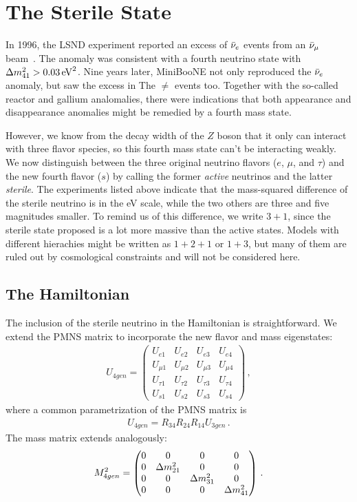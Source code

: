 % 
\section{The Sterile State}\label{sec:anomalies}
In 1996, the LSND experiment reported an excess of $\bar{\nu}_e$ events from an $\bar{\nu}_\mu$ beam~\cite{lsnd}. The anomaly was consistent with a fourth
neutrino state with $\dm[41] > \SI{0.03}{\eV \squared}$. Nine years later, MiniBooNE not only reproduced the $\bar{\nu}_e$ anomaly, but saw the excess in The
$\ne$ events too. Together with the so-called reactor and gallium analomalies, there were indications that both appearance and disappearance
anomalies might be remedied by a fourth mass state.

However, we know from the decay width of the $Z$ boson that it only can interact with three flavor species, so this fourth mass state can't be interacting weakly.
We now distinguish between the three original neutrino flavors ($e$, $\mu$, and $\tau$) and the new fourth flavor ($s$) by calling the former \emph{active} neutrinos
and the latter \emph{sterile}. The experiments listed above indicate that the mass-squared difference of the sterile neutrino is in the \si{\eV} scale, while the two others
are three and five magnitudes smaller. To remind us of this difference, we write $3+1$, since the sterile state proposed is a lot more massive than the active states. Models
with different hierachies might be written as $1+2+1$ or $1+3$, but many of them are ruled out by cosmological constraints and will not be considered here. %

\subsection{The Hamiltonian}
The inclusion of the sterile neutrino in the Hamiltonian is straightforward. We extend the PMNS matrix to incorporate the new flavor and mass eigenstates: 
\begin{align}
    U_{4gen} =
    \begin{pmatrix}
    U_{e1} & U_{e2} & U_{e3} & U_{e4} \\
    U_{\mu1} & U_{\mu2} & U_{\mu3} & U_{\mu4} \\
    U_{\tau1} & U_{\tau2} & U_{\tau3} & U_{\tau4} \\
    U_{s1} & U_{s2} & U_{s3} & U_{s4}
    \end{pmatrix}\,,
\end{align}
where a common parametrization of the PMNS matrix is 
\begin{align}\label{eq:U4gen_param}
    U_{4gen} = R_{34}R_{24}R_{14}U_{3gen}\,.
\end{align}
The mass matrix extends analogously:
\begin{align}\label{eq:dm4gen}
    M^2_{4gen} =
    \begin{pmatrix}
        0 & 0 & 0 & 0\\
        0 & \dm_{21} & 0  & 0 \\
        0 & 0 & \dm_{31} & 0 \\
        0 & 0 & 0 & \dm_{41} \\
    \end{pmatrix}\,.
\end{align}

